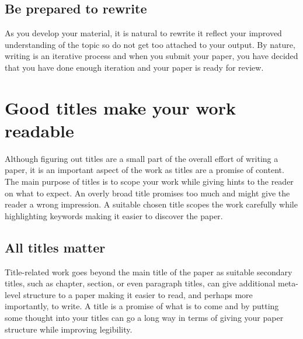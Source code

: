 \subsection{Be prepared to rewrite}

As you develop your material, it is natural to rewrite it reflect your improved understanding of the topic so do not get too attached to your output.
By nature, writing is an iterative process and when you submit your paper, you have decided that you have done enough iteration and your paper is ready for review.



\section{Good titles make your work readable}

Although figuring out titles are a small part of the overall effort of writing a paper, it is an important aspect of the work as titles are a promise of content.
The main purpose of titles is to scope your work while giving hints to the reader on what to expect.
An overly broad title promises too much and might give the reader a wrong impression.
A suitable chosen title scopes the work carefully while highlighting keywords making it easier to discover the paper.

\subsection{All titles matter}

Title-related work goes beyond the main title of the paper as suitable secondary titles, such as chapter, section, or even paragraph titles, can give additional meta-level structure to a paper making it easier to read, and perhaps more importantly, to write.
A title is a promise of what is to come and by putting some thought into your titles can go a long way in terms of giving your paper structure while improving legibility.

